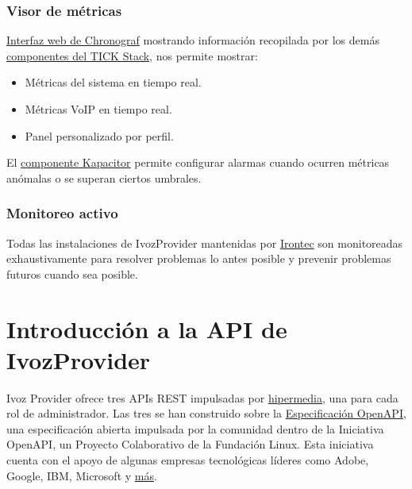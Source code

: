 \documentclass[letterpaper,10pt,spanish]{sphinxmanual}
\begin{document}
\subsection{Visor de métricas}
\label{security_and_maintenance/maintenance/other_tools:metrics-viewer}
\href{https://www.influxdata.com/time-series-platform/chronograf/}{Interfaz web de Chronograf} mostrando información recopilada por los demás \href{https://www.influxdata.com/time-series-platform/}{componentes del TICK Stack}, nos permite mostrar:
\begin{itemize}
\item {} 
Métricas del sistema en tiempo real.

\item {} 
Métricas VoIP en tiempo real.

\item {} 
Panel personalizado por perfil.

\end{itemize}

El \href{https://www.influxdata.com/time-series-platform/kapacitor/}{componente Kapacitor} permite configurar alarmas cuando ocurren métricas anómalas o se superan ciertos umbrales.


\subsection{Monitoreo activo}
\label{security_and_maintenance/maintenance/other_tools:active-monitoring}
Todas las instalaciones de IvozProvider mantenidas por \href{https://www.irontec.com}{Irontec} son monitoreadas exhaustivamente para resolver problemas lo antes posible y prevenir problemas futuros cuando sea posible.


\chapter{Introducción a la API de IvozProvider}
\label{api_rest/introduction:introduction-to-ivozprovider-api}\label{api_rest/introduction::doc}
Ivoz Provider ofrece tres APIs REST impulsadas por \href{https://en.wikipedia.org/wiki/HATEOAS}{hipermedia}, una para cada rol de administrador. Las tres se han construido sobre la \href{https://www.openapis.org/}{Especificación OpenAPI}, una especificación abierta impulsada por la comunidad dentro de la Iniciativa OpenAPI, un Proyecto Colaborativo de la Fundación Linux. Esta iniciativa cuenta con el apoyo de algunas empresas tecnológicas líderes como Adobe, Google, IBM, Microsoft y \href{https://www.openapis.org/membership/members)}{más}.
\end{document}
